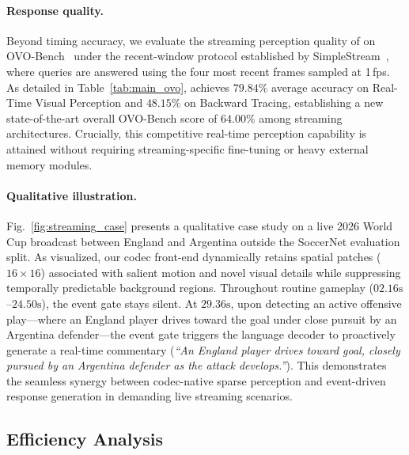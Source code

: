 

\paragraph{Response quality.} 
Beyond timing accuracy, we evaluate the streaming perception quality of \magevl on OVO-Bench~\citep{li2025ovobench} under the recent-window protocol established by SimpleStream~\citep{shen2026simplestream}, where queries are answered using the four most recent frames sampled at 1\,fps. 
As detailed in Table~\ref{tab:main_ovo}, \magevl achieves $79.84\%$ average accuracy on Real-Time Visual Perception and $48.15\%$ on Backward Tracing, establishing a new state-of-the-art overall OVO-Bench score of $64.00\%$ among streaming architectures. Crucially, this competitive real-time perception capability is attained without requiring streaming-specific fine-tuning or heavy external memory modules.



\paragraph{Qualitative illustration.} 
Fig.~\ref{fig:streaming_case} presents a qualitative case study on a live 2026 World Cup broadcast between England and Argentina outside the SoccerNet evaluation split. As visualized, our codec front-end dynamically retains spatial patches ($16{\times}16$) associated with salient motion and novel visual details while suppressing temporally predictable background regions. Throughout routine gameplay ($02.16\text{s}$--$24.50\text{s}$), the event gate stays silent. At $29.36\text{s}$, upon detecting an active offensive play—where an England player drives toward the goal under close pursuit by an Argentina defender—the event gate triggers the language decoder to proactively generate a real-time commentary (\emph{``An England player drives toward goal, closely pursued by an Argentina defender as the attack develops.''}). This demonstrates the seamless synergy between codec-native sparse perception and event-driven response generation in demanding live streaming scenarios.






\subsection{Efficiency Analysis}
\label{sec:efficiency_analysis}

